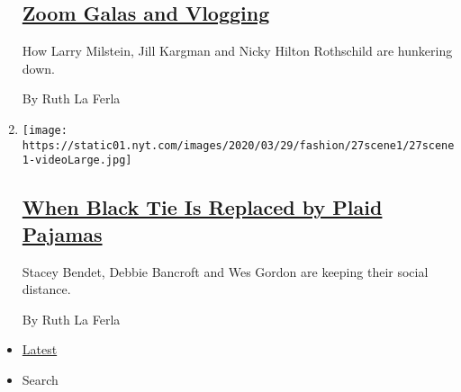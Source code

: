 \begin{enumerate}
  \hypertarget{zoom-galas-and-vlogging}{%
  \subsection{\texorpdfstring{\href{/2020/04/03/style/zoom-galas-and-vlogging.html}{Zoom
  Galas and
  Vlogging}}{Zoom Galas and Vlogging}}\label{zoom-galas-and-vlogging}}

  How Larry Milstein, Jill Kargman and Nicky Hilton Rothschild are
  hunkering down.

  By Ruth La Ferla
\item
  \texttt{[image: https://static01.nyt.com/images/2020/03/29/fashion/27scene1/27scene1-videoLarge.jpg]}

  \hypertarget{when-black-tie-is-replaced-by-plaid-pajamas}{%
  \subsection{\texorpdfstring{\href{/2020/03/27/style/when-black-tie-is-replaced-by-plaid-pajamas.html}{When
  Black Tie Is Replaced by Plaid
  Pajamas}}{When Black Tie Is Replaced by Plaid Pajamas}}\label{when-black-tie-is-replaced-by-plaid-pajamas}}

  Stacey Bendet, Debbie Bancroft and Wes Gordon are keeping their social
  distance.

  By Ruth La Ferla
\end{enumerate}

\begin{itemize}
\tightlist
\item
  \protect\hyperlink{stream-panel}{Latest}
\item
  Search
\end{itemize}

